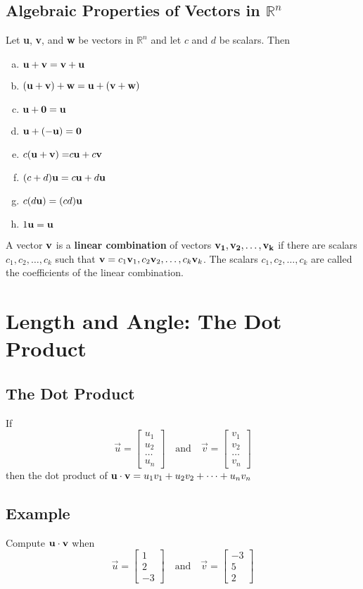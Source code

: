 \subsection*{Algebraic Properties of Vectors in $\mathbb{R}^n$}
Let \textbf{u}, \textbf{v}, and \textbf{w} be vectors in $\mathbb{R}^n$ and let
$c$ and $d$ be scalars. Then
\begin{enumerate}[(a)]
    \item $\mathbf{u+v=v+u}$
    \item $\mathbf{(u + v) + w = u + (v + w)}$
    \item $\mathbf{u + 0 = u}$
    \item $\mathbf{u + (-u) = 0}$
    \item $c\mathbf{(u + v)=}c\mathbf{u}+c\mathbf{v}$
    \item $(c+d)\mathbf{u}=c\mathbf{u}+d\mathbf{u}$
    \item $c(d\mathbf{u})=(cd)\mathbf{u}$
    \item $1\mathbf{u}=\mathbf{u}$
\end{enumerate}

A vector $\mathbf{v}$ is a \textbf{linear combination} of vectors $\mathbf{v_1,v_2,\dots,v_k}$ if
there are scalars $c_1,c_2, \dots , c_k$ such that $\mathbf{v}=c_1\mathbf{v}_1,c_2\mathbf{v}_2,\dots,c_k\mathbf{v}_k$.
The scalars $c_1,c_2,\dots,c_k$ are called the coefficients of the linear combination.

\section{Length and Angle: The Dot Product}

\subsection*{The Dot Product}
If
$$\vec{u}=\begin{bmatrix}
        u_1 \\ u_2 \\ \dots \\ u_n
    \end{bmatrix} \quad \text{and} \quad
    \vec{v}=\begin{bmatrix}
        v_1 \\ v_2 \\ \dots \\ v_n
    \end{bmatrix}$$
then the dot product of $\mathbf{u \cdot v} = u_1v_1 + u_2v_2 + \dots + u_nv_n$

\subsection*{Example}
Compute $\mathbf{u \cdot v}$ when
$$\vec{u}=\begin{bmatrix}
        1 \\ 2 \\ -3
    \end{bmatrix} \quad \text{and} \quad
    \vec{v}=\begin{bmatrix}
        -3 \\ 5 \\ 2
    \end{bmatrix}$$

